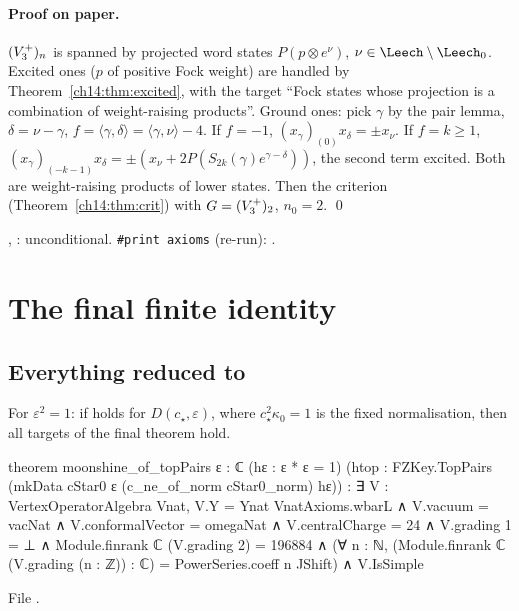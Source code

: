 \paragraph{Proof on paper.}  $(V_3^{+})_n$ is spanned by projected word states $P(p\otimes e^\nu)$,
$\nu\in\Leech\setminus\Leech_0$.  Excited ones ($p$ of positive Fock weight) are handled by
Theorem~\ref{ch14:thm:excited}, with the target ``Fock states whose projection is a combination of
weight-raising products''.  Ground ones: pick $\gamma$ by the pair lemma, $\delta=\nu-\gamma$,
$f=\langle\gamma,\delta\rangle=\langle\gamma,\nu\rangle-4$.  If $f=-1$, $(x_\gamma)_{(0)}x_\delta=\pm x_\nu$.  If $f=k\ge1$,
$(x_\gamma)_{(-k-1)}x_\delta=\pm(x_\nu+2P(S_{2k}(\gamma)e^{\gamma-\delta}))$, the second term excited.  Both are
weight-raising products of lower states.  Then the criterion (Theorem~\ref{ch14:thm:crit}) with $G=(V_3^{+})_2$,
$n_0=2$. \qed

\begin{status}
, : unconditional.  \texttt{\#print axioms}  (re-run): .
\end{status}

\section{The final finite identity}\label{ch14:sec:toppairs}

\subsection{\texorpdfstring{Everything reduced to }{Everything reduced to TopPairs}}

\begin{theorem}\label{ch14:thm:maintop}
For $\varepsilon^2=1$: if  holds for $D(c_\star,\varepsilon)$, where $c_\star^2\kappa_0=1$ is the
fixed normalisation, then all targets of the final theorem hold.
\end{theorem}
\begin{leancode}
theorem moonshine_of_topPairs {ε : ℂ} (hε : ε * ε = 1)
    (htop : FZKey.TopPairs (mkData cStar0 ε (c_ne_of_norm cStar0_norm) hε)) :
    ∃ V : VertexOperatorAlgebra Vnat,
      V.Y = Ynat VnatAxioms.wbarL ∧ V.vacuum = vacNat ∧ V.conformalVector = omegaNat ∧
      V.centralCharge = 24 ∧
      V.grading 1 = ⊥ ∧
      Module.finrank ℂ (V.grading 2) = 196884 ∧
      (∀ n : ℕ, (Module.finrank ℂ (V.grading (n : ℤ)) : ℂ) = PowerSeries.coeff n JShift) ∧
      V.IsSimple
\end{leancode}
File .

